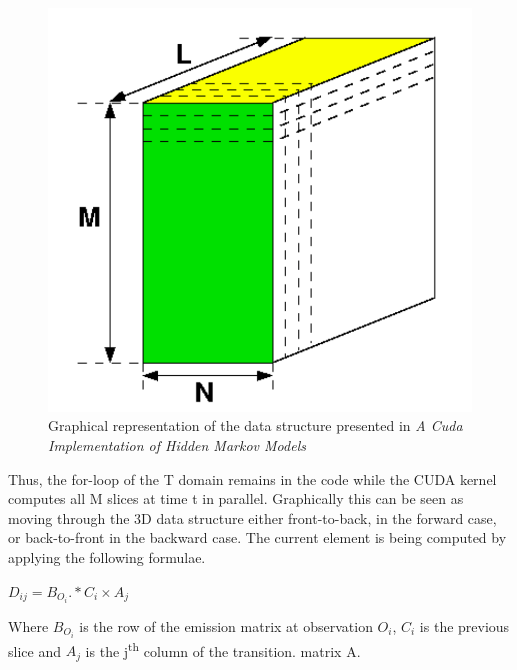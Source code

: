 \documentclass[english, paper=a4]{scrartcl}
\begin{document}
\begin{figure}[H]
\centering

\includegraphics[scale=0.3]{"3d_trellis"}
  \caption{Graphical representation of the data structure presented in \textit{A Cuda Implementation of Hidden Markov Models}\cite{cuhmm}}
\end{figure}


Thus, the for-loop of the T domain remains in the code while the CUDA kernel computes all M slices at time t in parallel. Graphically this can be seen as moving through the 3D data structure either front-to-back, in the forward case, or back-to-front in the backward case. The current element is being computed by applying the following formulae.

\begin{center}

\( D_{ij} = B_{O_i} .* C_i \times A_j \)

\end{center}

Where \( B_{O_i}\) is the row of the emission matrix at observation \(O_i\), \(C_i\) is the previous slice and \(A_j\) is the j\textsuperscript{th} column of the transition. matrix A.
\end{document}
